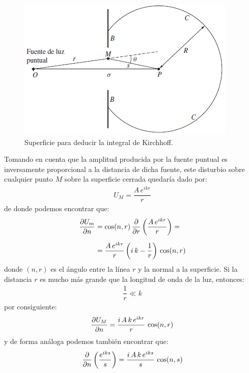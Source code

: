 \documentclass[14pt]{extarticle}
\begin{document}
\begin{figure}[H]
    \centering
    \includegraphics[scale=1]{Imagenes/Difraccion_04.png}
    \caption{Superficie para deducir la integral de Kirchhoff.}
    \label{fig:figura_X_04}
\end{figure}
Tomando en cuenta que la amplitud producida por la fuente puntual es inversamente proporcional a la distancia de dicha fuente, este disturbio sobre cualquier punto $M$ sobre la superficie cerrada quedaría dado por:
\begin{align}
U_{M} = \dfrac{A \, e^{i k r}}{r}
\label{eq:ecuacion_X_02}
\end{align}
de donde podemos encontrar que:
\begin{eqnarray}
\begin{aligned}[b]
\pdv{U_{m}}{n} &= \cos (n, r) \, \pdv{r} \left( \dfrac{A \, e^{i k r}}{r} \right) = \\[0.5em]
&=  \dfrac{A \, e^{i k r}}{r} \left( i \, k - \dfrac{1}{r} \right) \, \cos (n, r)
\end{aligned}
\label{eq:ecuacion_X_03}
\end{eqnarray}
donde $(n, r)$ es el ángulo entre la línea $r$ y la normal a la superficie. Si la distancia $r$ es mucho más grande que la longitud de onda de la luz, entonces:
\begin{align}
\dfrac{1}{r} \ll k
\label{eq:ecuacion_X_04}
\end{align}
por consiguiente:
\begin{align}
\pdv{U_{M}}{n} = \dfrac{i \, A \, k \, e^{i k r}}{r} \, \cos (n, r)
\label{eq:ecuacion_X_05}
\end{align}
y de forma análoga podemos también encontrar que:
\begin{align}
\pdv{n} \left( \dfrac{e^{i k s}}{s} \right) = \dfrac{i \, A \, k \, e^{i k s}}{s} \, \cos (n, s)
\label{eq:ecuacion_X_06}
\end{align}
\end{document}
